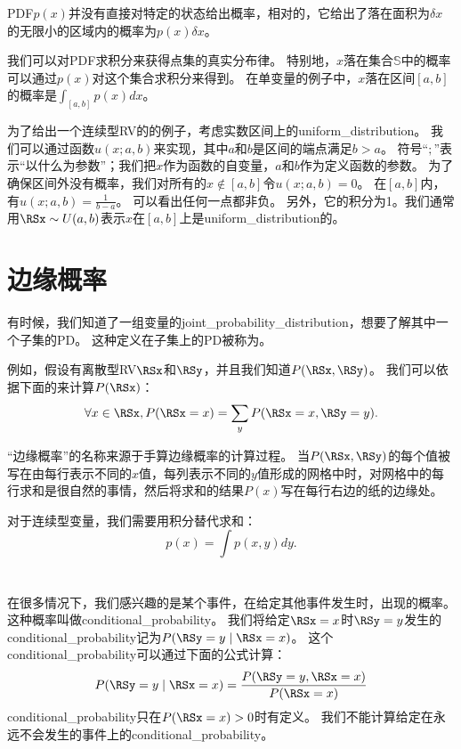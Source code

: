 \gls{PDF}$p(x)$并没有直接对特定的状态给出概率，相对的，它给出了落在面积为$\delta x$ 的无限小的区域内的概率为$p(x)\delta x$。

我们可以对\gls{PDF}求积分来获得点集的真实分布律。
特别地，$x$落在集合$\mathbb{S}$中的概率可以通过$p(x)$对这个集合求积分来得到。
在单变量的例子中，$x$落在区间$[a, b]$的概率是$\int_{[a,b]} p(x)dx$。

为了给出一个连续型\gls{RV}的的例子，考虑实数区间上的\gls{uniform_distribution}。
我们可以通过函数$u(x; a, b)$来实现，其中$a$和$b$是区间的端点满足$b>a$。
符号``$;$''表示``以什么为参数''；我们把$x$作为函数的自变量，$a$和$b$作为定义函数的参数。
为了确保区间外没有概率，我们对所有的$x\not\in[a,b]$令$u(x; a, b)=0$。
在$[a,b]$内，有$u(x; a, b)= \frac{1}{b-a}$。
可以看出任何一点都非负。
另外，它的积分为1。我们通常用$\RSx \sim U(a, b)$表示$x$在$[a, b]$上是\gls{uniform_distribution}的。

\section{边缘概率}
\label{sec:marginal_probability}

有时候，我们知道了一组变量的\gls{joint_probability_distribution}，想要了解其中一个子集的\gls{PD}。
这种定义在子集上的\gls{PD}被称为。

例如，假设有离散型\gls{RV}$\RSx$和$\RSy$，并且我们知道$P(\RSx, \RSy)$。
我们可以依据下面的来计算$P(\RSx)$：
\begin{equation}
\forall x \in \RSx, P(\RSx = x) = \sum_y P(\RSx = x, \RSy = y).
\end{equation}


``边缘概率''的名称来源于手算边缘概率的计算过程。
当$P(\RSx, \RSy)$的每个值被写在由每行表示不同的$x$值，每列表示不同的$y$值形成的网格中时，对网格中的每行求和是很自然的事情，然后将求和的结果$P(x)$写在每行右边的纸的边缘处。

对于连续型变量，我们需要用积分替代求和：
\begin{equation}
p(x) = \int p(x, y)dy.
\end{equation}

\section{}
\label{sec:conditional_probability}

在很多情况下，我们感兴趣的是某个事件，在给定其他事件发生时，出现的概率。
这种概率叫做\gls{conditional_probability}。
我们将给定$\RSx = x$时$\RSy = y$发生的\gls{conditional_probability}记为$P(\RSy = y\mid \RSx =x)$。
这个\gls{conditional_probability}可以通过下面的公式计算：
\begin{equation}
P(\RSy = y\mid \RSx = x) = \frac{P(\RSy = y, \RSx = x)}{P(\RSx = x)}
\label{eq:3.5}
\end{equation}
\gls{conditional_probability}只在$P(\RSx = x)>0$时有定义。
我们不能计算给定在永远不会发生的事件上的\gls{conditional_probability}。

